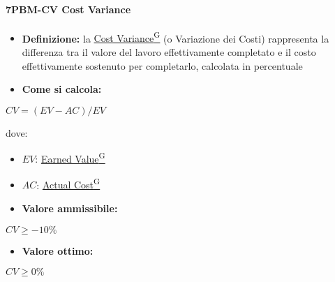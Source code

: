 \paragraph*{7PBM-CV Cost Variance}
\begin{itemize}
    \item \textbf{Definizione:} la \href{https://code7crusaders.github.io/docs/PB/documentazione_interna/glossario.html#cost-variance}{Cost Variance\textsuperscript{G}} (o Variazione dei Costi) rappresenta la differenza tra il valore del lavoro effettivamente completato e il costo effettivamente sostenuto per completarlo, calcolata in percentuale
    \item \textbf{Come si calcola:}
\end{itemize}
\begin{center}
   $CV = (EV - AC)/EV$ 
\end{center}
dove:
\begin{itemize}[label=$\rightarrow$]
    \item $EV$: \href{https://code7crusaders.github.io/docs/PB/documentazione_interna/glossario.html#earned-value}{Earned Value\textsuperscript{G}}
    \item $AC$: \href{https://code7crusaders.github.io/docs/PB/documentazione_interna/glossario.html#actual-cost}{Actual Cost\textsuperscript{G}}
\end{itemize}
\begin{itemize}
    \item \textbf{Valore ammissibile:}
\end{itemize}
\begin{center}
    $CV \geq -10\%$
\end{center}
\begin{itemize}
    \item \textbf{Valore ottimo:}
\end{itemize}
\begin{center}
    $CV \geq 0\%$
\end{center}

